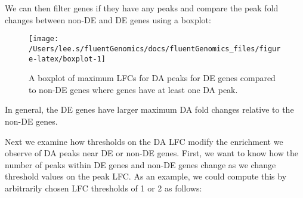\documentclass[
]{article}
\newenvironment{Shaded}{}{}
\newcommand{\DataTypeTok}[1]{\textcolor[rgb]{0.56,0.13,0.00}{#1}}
\newcommand{\DecValTok}[1]{\textcolor[rgb]{0.25,0.63,0.44}{#1}}
\newcommand{\KeywordTok}[1]{\textcolor[rgb]{0.00,0.44,0.13}{\textbf{#1}}}
\newcommand{\NormalTok}[1]{#1}
\newcommand{\OperatorTok}[1]{\textcolor[rgb]{0.40,0.40,0.40}{#1}}
\newcommand{\OtherTok}[1]{\textcolor[rgb]{0.00,0.44,0.13}{#1}}
\newcommand{\StringTok}[1]{\textcolor[rgb]{0.25,0.44,0.63}{#1}}
\begin{document}
We can then filter genes if they have any peaks and compare the peak fold
changes between non-DE and DE genes using a boxplot:

\begin{Shaded}
\end{Shaded}

\begin{figure}

{\centering \texttt{[image: /Users/lee.s/fluentGenomics/docs/fluentGenomics\_files/figure-latex/boxplot-1]} 

}

\caption{A boxplot of maximum LFCs for DA peaks for DE genes compared to
non-DE genes where genes have at least one DA peak.}\label{fig:boxplot}
\end{figure}

In general, the DE genes have larger maximum DA fold changes relative to the
non-DE genes.

Next we examine how thresholds on the DA LFC modify the enrichment we observe
of DA peaks near DE or non-DE genes. First, we want to know how the number of
peaks within DE genes and non-DE genes change as we change threshold values on
the peak LFC. As an example, we could compute this by arbitrarily chosen LFC
thresholds of 1 or 2 as follows:

\begin{Shaded}
\end{Shaded}
\end{document}
